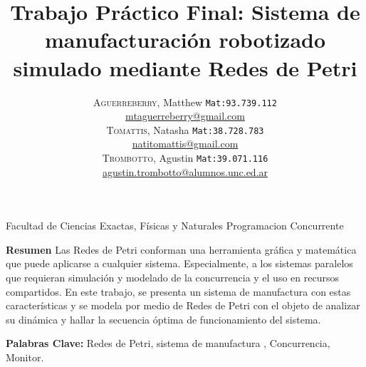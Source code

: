 \documentclass[10pt, a4paper,notitlepage]{article}
\newcommand{\HRule}{\rule{\linewidth}{0.5mm}} %
\begin{document}
{\center \large \textsf{Facultad de Ciencias Exactas, Físicas y Naturales Programacion Concurrente\\}}
\title{%
		{ \bfseries{Trabajo Práctico Final: Sistema de manufacturación robotizado simulado mediante Redes de Petri}}\\[0.4cm]
		} %
\author{
	\textsc{Aguerreberry}, Matthew  {\small \texttt{Mat:93.739.112}}\\
	\href{mailto:mtaguerreberry@gmail.com}{mtaguerreberry@gmail.com}\\
	\textsc{Tomattis}, Natasha  {\small \texttt{Mat:38.728.783}}\\
	\href{mailto:natitomattis@gmail.com}{natitomattis@gmail.com}\\
	\textsc{Trombotto}, Agustin  {\small \texttt{Mat:39.071.116}}\\
	\href{mailto:agustin.trombotto@alumnos.unc.ed.ar}{agustin.trombotto@alumnos.unc.ed.ar}\\
}

{\let\newpage\relax\maketitle}

\begin{par}  
\textbf{Resumen} Las Redes de Petri conforman una herramienta gráfica y matemática que puede aplicarse a cualquier sistema. Especialmente, a los sistemas paralelos que requieran simulación y modelado de la concurrencia y el uso en recursos compartidos. En este trabajo, se presenta un sistema de manufactura con estas características y se modela por medio de Redes de Petri con el objeto de analizar su dinámica y hallar la secuencia óptima de funcionamiento del sistema.
\\  
\end{par}

\textbf{Palabras Clave:} Redes de Petri, sistema de manufactura , Concurrencia, Monitor.\\
\end{document}
